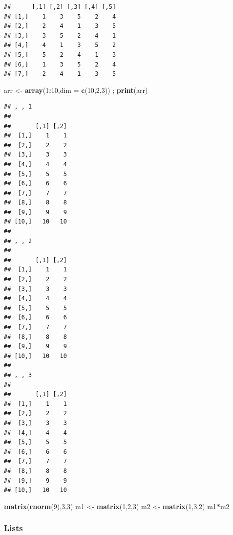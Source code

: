 \documentclass[
]{book}
\newenvironment{Shaded}{\begin{snugshade}}{\end{snugshade}}
\newcommand{\DataTypeTok}[1]{\textcolor[rgb]{0.13,0.29,0.53}{#1}}
\newcommand{\DecValTok}[1]{\textcolor[rgb]{0.00,0.00,0.81}{#1}}
\newcommand{\KeywordTok}[1]{\textcolor[rgb]{0.13,0.29,0.53}{\textbf{#1}}}
\newcommand{\NormalTok}[1]{#1}
\newcommand{\OperatorTok}[1]{\textcolor[rgb]{0.81,0.36,0.00}{\textbf{#1}}}
\newcommand{\StringTok}[1]{\textcolor[rgb]{0.31,0.60,0.02}{#1}}
\begin{document}
\begin{verbatim}
##      [,1] [,2] [,3] [,4] [,5]
## [1,]    1    3    5    2    4
## [2,]    2    4    1    3    5
## [3,]    3    5    2    4    1
## [4,]    4    1    3    5    2
## [5,]    5    2    4    1    3
## [6,]    1    3    5    2    4
## [7,]    2    4    1    3    5
\end{verbatim}

\begin{Shaded}
\begin{Highlighting}[]
\NormalTok{arr <-}\StringTok{ }\KeywordTok{array}\NormalTok{(}\DecValTok{1}\OperatorTok{:}\DecValTok{10}\NormalTok{,}\DataTypeTok{dim =} \KeywordTok{c}\NormalTok{(}\DecValTok{10}\NormalTok{,}\DecValTok{2}\NormalTok{,}\DecValTok{3}\NormalTok{)) ; }\KeywordTok{print}\NormalTok{(arr)}
\end{Highlighting}
\end{Shaded}

\begin{verbatim}
## , , 1
## 
##       [,1] [,2]
##  [1,]    1    1
##  [2,]    2    2
##  [3,]    3    3
##  [4,]    4    4
##  [5,]    5    5
##  [6,]    6    6
##  [7,]    7    7
##  [8,]    8    8
##  [9,]    9    9
## [10,]   10   10
## 
## , , 2
## 
##       [,1] [,2]
##  [1,]    1    1
##  [2,]    2    2
##  [3,]    3    3
##  [4,]    4    4
##  [5,]    5    5
##  [6,]    6    6
##  [7,]    7    7
##  [8,]    8    8
##  [9,]    9    9
## [10,]   10   10
## 
## , , 3
## 
##       [,1] [,2]
##  [1,]    1    1
##  [2,]    2    2
##  [3,]    3    3
##  [4,]    4    4
##  [5,]    5    5
##  [6,]    6    6
##  [7,]    7    7
##  [8,]    8    8
##  [9,]    9    9
## [10,]   10   10
\end{verbatim}

\begin{Shaded}
\begin{Highlighting}[]
\KeywordTok{matrix}\NormalTok{(}\KeywordTok{rnorm}\NormalTok{(}\DecValTok{9}\NormalTok{),}\DecValTok{3}\NormalTok{,}\DecValTok{3}\NormalTok{)}
\NormalTok{m1 <-}\StringTok{ }\KeywordTok{matrix}\NormalTok{(}\DecValTok{1}\NormalTok{,}\DecValTok{2}\NormalTok{,}\DecValTok{3}\NormalTok{)}
\NormalTok{m2 <-}\StringTok{ }\KeywordTok{matrix}\NormalTok{(}\DecValTok{1}\NormalTok{,}\DecValTok{3}\NormalTok{,}\DecValTok{2}\NormalTok{)}
\NormalTok{m1}\OperatorTok{*}\NormalTok{m2}
\end{Highlighting}
\end{Shaded}

\hypertarget{lists}{%
\subsubsection{Lists}\label{lists}}
\end{document}
